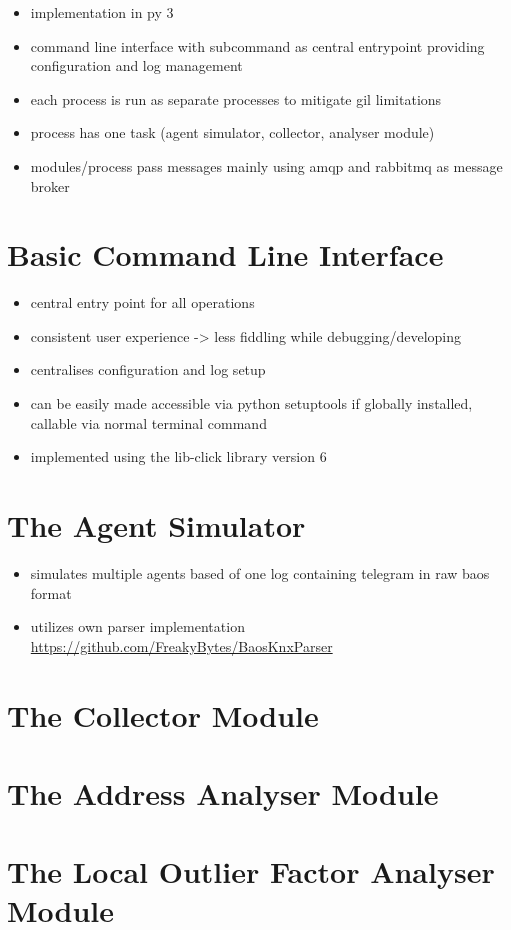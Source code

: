 
\begin{itemize}
	\item implementation in \gls{py} 3
	\item command line interface with subcommand as central entrypoint providing configuration and log management
	\item each process is run as separate processes to mitigate \gls{gil} limitations
	\item process has one task (agent simulator, collector, analyser module)
	\item modules/process pass messages mainly using \gls{amqp} and \gls{rabbitmq} as message broker
\end{itemize}

\section{Basic Command Line Interface}
\label{sec:impl:cli}

\begin{itemize}
	\item central entry point for all operations
	\item consistent user experience -> less fiddling while debugging/developing
	\item centralises configuration and log setup
	\item can be easily made accessible via python setuptools
		\subitem if globally installed, callable via normal terminal command
	\item implemented using the \gls{lib-click} library version 6
\end{itemize}

\section{The Agent Simulator}
\label{sec:impl:agent}

\begin{itemize}
	\item simulates multiple agents based of one log containing telegram in raw \gls{baos} format
	\item utilizes own parser implementation \url{https://github.com/FreakyBytes/BaosKnxParser}
\end{itemize}

\section{The Collector Module}
\label{sec:impl:collector}

\section{The Address Analyser Module}
\label{sec:impl:addr}

\section{The Local Outlier Factor Analyser Module}
\label{sec:impl:lof}

